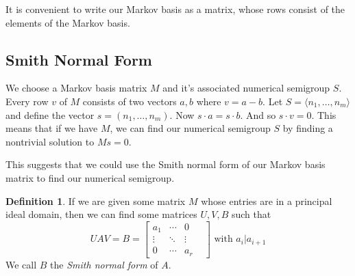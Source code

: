 \documentclass[11pt]{amsart}
\theoremstyle{plain}
\theoremstyle{definition}
\newtheorem{defi}{Definition}
\begin{document}
It is convenient to write our Markov basis as a matrix, whose rows consist of
the elements of the Markov basis.
\subsection{Smith Normal Form}
We choose a Markov basis matrix $M$ and it's associated numerical semigroup $S$.
Every row $v$ of $M$ consists of two vectors $a,b$ where $v=a-b$. Let $S=
\langle n_1,\dots,n_m\rangle$ and define the vector $s=(n_1,\dots,n_m)$. Now
$s\cdot a=s\cdot b$. And so $s\cdot v=0$. This means that if we have $M$, we can
find our numerical semigroup $S$ by finding a nontrivial solution to $Ms=0$.

This suggests that we could use the Smith normal form of our Markov basis matrix
to find our numerical semigroup.
\begin{defi}
  If we are given some matrix $M$ whose entries are in a principal ideal domain,
  then we can find some matrices $U,V,B$ such that
\[UAV=B=
\left[\begin{array}{cccc}
  a_1&\cdots&0\\
  \vdots&\ddots&\vdots \\
  0&\cdots&a_r&
\end{array}\right]
\text{ with }a_i|a_{i+1}\]
We call $B$ the \emph{Smith normal form} of $A$.\cite{adkins}
\end{defi}
\end{document}
